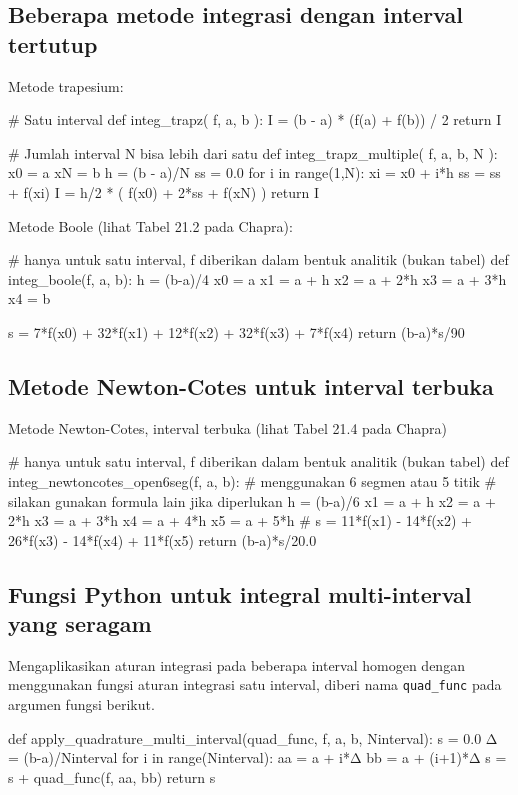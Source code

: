 \documentclass[a4paper,11pt,bahasa]{article} %
\newcommand{\pyinline}[1]{\texttt{#1}}
\begin{document}
\subsection*{Beberapa metode integrasi dengan interval tertutup}

Metode trapesium:
\begin{pythoncode}
# Satu interval
def integ_trapz( f, a, b ):
    I = (b - a) * (f(a) + f(b)) / 2
    return I

# Jumlah interval N bisa lebih dari satu
def integ_trapz_multiple( f, a, b, N ):
    x0 = a
    xN = b
    h = (b - a)/N
    ss = 0.0
    for i in range(1,N):
        xi = x0 + i*h
        ss = ss + f(xi)
    I = h/2 * ( f(x0) + 2*ss + f(xN) )
    return I
\end{pythoncode}

Metode Boole (lihat Tabel 21.2 pada Chapra):
\begin{pythoncode}
# hanya untuk satu interval, f diberikan dalam bentuk analitik (bukan tabel)
def integ_boole(f, a, b):
    h = (b-a)/4
    x0 = a
    x1 = a + h
    x2 = a + 2*h
    x3 = a + 3*h
    x4 = b

    s = 7*f(x0) + 32*f(x1) + 12*f(x2) + 32*f(x3) + 7*f(x4)
    return (b-a)*s/90
\end{pythoncode}

\subsection*{Metode Newton-Cotes untuk interval terbuka}

Metode Newton-Cotes, interval terbuka (lihat Tabel 21.4 pada Chapra)
\begin{pythoncode}
# hanya untuk satu interval, f diberikan dalam bentuk analitik (bukan tabel)
def integ_newtoncotes_open6seg(f, a, b):
    # menggunakan 6 segmen atau 5 titik
    # silakan gunakan formula lain jika diperlukan
    h = (b-a)/6
    x1 = a + h
    x2 = a + 2*h
    x3 = a + 3*h
    x4 = a + 4*h
    x5 = a + 5*h
    #
    s = 11*f(x1) - 14*f(x2) + 26*f(x3) - 14*f(x4) + 11*f(x5)
    return (b-a)*s/20.0
\end{pythoncode}


\subsection*{Fungsi Python untuk integral multi-interval yang seragam}

Mengaplikasikan aturan integrasi pada beberapa interval homogen
dengan menggunakan fungsi aturan integrasi satu interval, diberi nama
\pyinline{quad_func} pada argumen fungsi berikut.
\begin{pythoncode}
def apply_quadrature_multi_interval(quad_func, f, a, b, Ninterval):
    s = 0.0
    Δ = (b-a)/Ninterval
    for i in range(Ninterval):
        aa = a + i*Δ
        bb = a + (i+1)*Δ
        s = s + quad_func(f, aa, bb)
    return s
\end{pythoncode}
\end{document}
